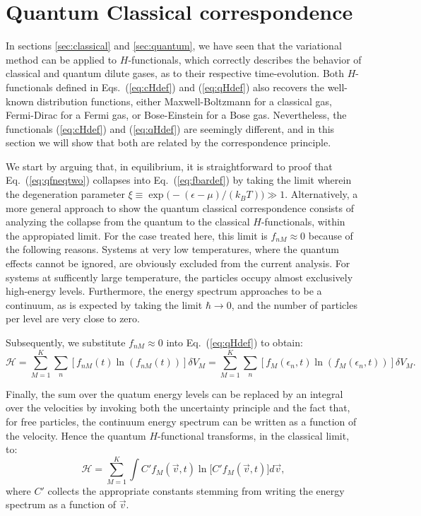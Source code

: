 

\section{Quantum Classical correspondence}\label{sec:qccorrespondence}

In sections \ref{sec:classical} and \ref{sec:quantum}, we have seen that the variational
method can be applied to $H$-functionals, which correctly describes the behavior of
classical and quantum dilute gases, as to their respective time-evolution.
Both $H$-functionals defined in Eqs.~(\ref{eq:cHdef}) and
(\ref{eq:qHdef}) also recovers the well-known distribution functions, either Maxwell-Boltzmann
for a classical gas, Fermi-Dirac for a Fermi gas, or Bose-Einstein for a Bose gas. Nevertheless,
the functionals (\ref{eq:cHdef}) and
(\ref{eq:qHdef}) are seemingly different, and in this section we will show that both are
related by the correspondence principle.

We start by arguing that, in equilibrium, it is straightforward to proof that
Eq.~(\ref{eq:qfneqtwo}) collapses
into Eq.~(\ref{eq:fbardef}) by taking the limit wherein the 
degeneration parameter $\xi\equiv\exp\big(-(\epsilon-\mu)/(k_BT)\big) \gg 1$.
Alternatively, a more general approach to show the quantum classical correspondence
consists of analyzing the collapse from the quantum to the classical $H$-functionals,
within the appropiated limit.
For the case treated here, this limit is $f_{nM} \approx 0$ because of the following reasons.
Systems at very low temperatures, where the quantum effects cannot be ignored, are obviously excluded
from the current analysis. For systems at sufficently large temperature, the particles
occupy almost exclusively high-energy levels. 
Furthermore, the energy spectrum approaches to be a continuum, as is expected by taking the limit
$\hbar\to0$, and the number of particles per level are very close to zero.

Subsequently, we substitute $f_{nM}\approx0$ into Eq.~(\ref{eq:qHdef}) to obtain:
%
\begin{equation}\label{h-quantic2}
    \mathcal{H}= \sum_{M=1}^{K} \sum_n
    \left[ f_{nM}(t)\ln \left(f_{nM}(t)\right)\right] \delta V_M
    =\sum_{M=1}^{K} \sum_n
    \left[ f_{M}(\epsilon_n,t) \ln \left( f_{M}(\epsilon_n,t)\right)\right] \delta V_M.
\end{equation}
%

Finally, the sum over the quatum energy levels can be replaced by an integral over the velocities
by invoking both the uncertainty principle and the fact that, for free particles, the continuum
energy spectrum
can be written as a function of the velocity. Hence the quantum $H$-functional
transforms, in the classical limit, to:
%
\begin{equation}\label{eq:qHclassLim}
    \mathcal{H}= \sum_{M=1}^{K}\int C'f_M(\vec v,t)\ln\big[C' f_M(\vec v,t)\big] d\vec v,
\end{equation}
%
where $C'$ collects the appropriate constants stemming from writing the energy spectrum as
a function of $\vec v$.






